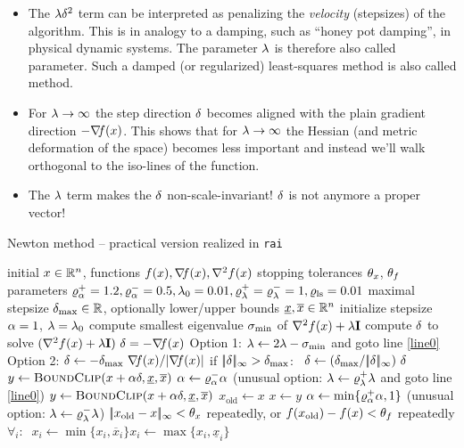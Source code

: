 \begin{itemize}
\item The $\lambda{\delta}^2$ term can be interpreted as penalizing
the \emph{velocity} (stepsizes) of the algorithm. This is in analogy
to a damping, such as ``honey pot damping'', in physical dynamic
systems. The parameter $\lambda$ is therefore also called 
parameter. Such a damped (or regularized) least-squares method is
also called  method.

\item For $\lambda\to\infty$ the step direction ${\delta}$ becomes aligned
with the plain gradient direction $-{\nabla_{\!\!}} f(x)$. This shows that for
$\lambda\to\infty$ the Hessian (and metric deformation of the space)
becomes less important and instead we'll walk orthogonal to the
iso-lines of the function.

\item The $\lambda$ term makes the ${\delta}$ non-scale-invariant! ${\delta}$ is
not anymore a proper vector!
\end{itemize}

\begin{algorithm}[p]
\caption{\label{algNewton2} Newton method -- practical version realized in \texttt{rai}}
\begin{algorithmic}[1]
  \Require initial $x\in{\mathbb{R}}^n$, functions $f(x), {\nabla_{\!\!}} f(x), {\nabla_{\!\!}^2} f(x)$
  \Require stopping tolerances $\theta_x$, $\theta_f$
  \Require parameters $\varrho_\alpha^+=1.2, \varrho_\alpha^-=0.5, \lambda_0=0.01, \varrho_\lambda^+=\varrho_\lambda^-=1, \varrho_{\text{ls}}=0.01$
  \Require maximal stepsize $\delta_\text{max} \in {\mathbb{R}}$, optionally lower/upper bounds $\underline x,\overline x\in{\mathbb{R}}^n$
  \Statex
  \State initialize stepsize $\alpha=1$, $\lambda = \lambda_0$
  \Repeat
  \State compute smallest eigenvalue $\sigma_\text{min}$ of ${\nabla_{\!\!}^2} f(x) + \lambda {\rm\bf I}$ \label{line0}
  \State compute ${\delta}$ to solve $({\nabla_{\!\!}^2} f(x) + \lambda {\rm\bf I})~ {\delta} = - {\nabla_{\!\!}} f(x)$
  \Else
  \State Option 1: $\lambda \gets 2\lambda - \sigma_\text{min}$ and goto line \ref{line0} 
  \State Option 2: ${\delta} \gets - \delta_\text{max}~ {\nabla_{\!\!}} f(x) / |{\nabla_{\!\!}} f(x)|$ 
  \EndIf
  \State if $|\!|\delta|\!|_\infty > \delta_\text{max}$:~ ${\delta} \gets (\delta_\text{max}/|\!|\delta|\!|_\infty)~ {\delta}$ 
  \State $y \gets \textsc{BoundClip}(x+\alpha{\delta},\underline x,\overline x)$
   
  \State $\alpha \gets \varrho_\alpha^-\alpha$ 
  \State (unusual option: $\lambda \gets \varrho_\lambda^+\lambda$ and goto line \ref{line0}) 
  \State $y \gets \textsc{BoundClip}(x+\alpha{\delta},\underline x,\overline x)$
  \EndWhile
  \State $x_\text{old} \gets x$
  \State $x \gets y$ 
  \State $\alpha \gets \min\{\varrho_\alpha^+\alpha,1\}$ 
  \State (unusual option: $\lambda \gets \varrho_\lambda^-\lambda$) 
  \Until $|\!|x_\text{old}-x|\!|_\infty < \theta_x$ repeatedly, or $f(x_\text{old})-f(x) < \theta_f$ repeatedly
\Statex
{}
\State $\forall_i:~$ $x_i \gets \min\{x_i,\overline x_i\}$\comma $x_i \gets \max\{x_i, \underline x_i\}$
\EndProcedure
\end{algorithmic}
\end{algorithm}


